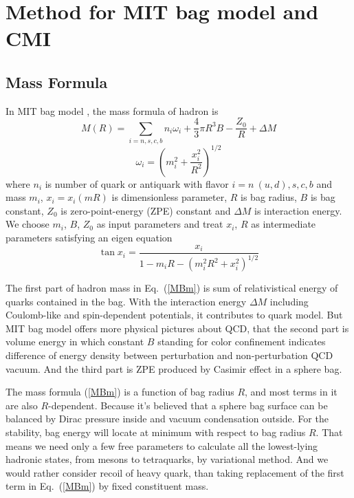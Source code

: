 \documentclass[prd,twocolumn,floatfix,nofootinbib]{revtex4}
\begin{document}
\section{Method for MIT bag model and CMI}\label{Method}
\subsection{Mass Formula}
In MIT bag model \cite{Johnson:1975zp,DeGrand:1975cf}, the mass formula of hadron is
\begin{equation}\label{MBm}
    M\left(R\right)=\sum_{i=n,s,c,b} n_{i}\omega_{i}+\frac{4}{3}\pi R^{3}B-\frac{Z_{0}}{R}+\Delta M
\end{equation}
\begin{equation}\label{freq}
    \omega_{i}=\left(m_{i}^{2}+\frac{x_{i}^{2}}{R^2}\right)^{1/2}
\end{equation}
where $n_{i}$ is number of quark or antiquark with flavor $i=n\ (u, d), s, c, b$ and mass $m_{i}$, $x_{i}=x_{i}(mR)$ is dimensionless parameter, 
$R$ is bag radius, $B$ is bag constant, $Z_{0}$ is zero-point-energy (ZPE) constant and $\Delta M$ is interaction energy.
We choose $m_{i}$, $B$, $Z_{0}$ as input parameters and treat $x_{i}$, $R$ as intermediate parameters satisfying an eigen equation
\begin{equation}\label{transc}
    \tan x_{i}=\frac{x_{i}}{1-m_{i}R-\left(m_{i}^{2}R^{2}+x_{i}^{2}\right)^{1/2}}
\end{equation}

The first part of hadron mass in Eq.~(\ref{MBm}) is sum of relativistical energy of quarks contained in the bag.
With the interaction energy $\Delta M$ including Coulomb-like and spin-dependent potentials, it contributes to quark model.
But MIT bag model offers more physical pictures about QCD, 
that the second part is volume energy in which constant $B$ standing for color confinement indicates difference of energy density between perturbation and non-perturbation QCD vacuum.
And the third part is ZPE produced by Casimir effect in a sphere bag.

The mass formula (\ref{MBm}) is a function of bag radius $R$, and most terms in it are also $R$-dependent.
Because it’s believed that a sphere bag surface can be balanced by Dirac pressure inside and vacuum condensation outside. 
For the stability, bag energy will locate at minimum with respect to bag radius $R$. 
That means we need only a few free parameters to calculate all the lowest-lying hadronic states, from mesons to tetraquarks, by variational method.
And we would rather consider recoil of heavy quark, than taking replacement of the first term in Eq.~(\ref{MBm}) by fixed constituent mass.
\end{document}
